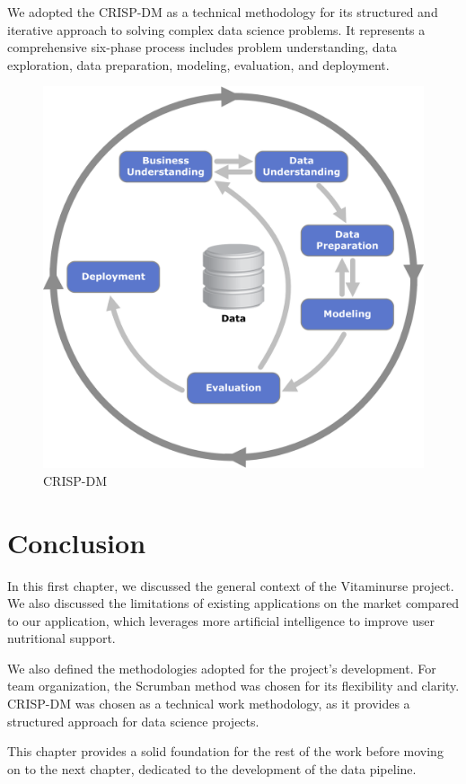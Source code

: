 We adopted the CRISP-DM as a technical methodology for its structured and iterative approach to solving complex data science problems. It represents a comprehensive six-phase process includes problem understanding, data exploration, data preparation, modeling, evaluation, and deployment.
\begin{center}
\begin{figure}[H]
            \centering
            \includegraphics[scale=0.44]{images/CRISP.png}
            \caption{CRISP-DM} 
            \label{fig:CRIS-DM}
        \end{figure}
\end{center}




\section*{Conclusion}
In this first chapter, we discussed the general context of the Vitaminurse project. We also discussed the limitations of existing applications on the market compared to our application, which leverages more artificial intelligence to improve user nutritional support.

We also defined the methodologies adopted for the project's development. For team organization, the Scrumban method was chosen for its flexibility and clarity. CRISP-DM was chosen as a technical work methodology, as it provides a structured approach for data science projects.

This chapter provides a solid foundation for the rest of the work before moving on to the next chapter, dedicated to the development of the data pipeline.

